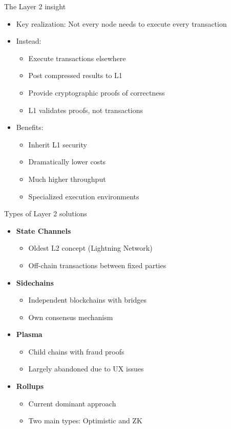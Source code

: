 \documentclass[aspectratio=169, lualatex, handout]{beamer}
\begin{document}
\begin{frame}{The Layer 2 insight}
	\begin{itemize}
		\item Key realization: Not every node needs to execute every transaction
		\item Instead:
		      \begin{itemize}
			      \item Execute transactions elsewhere
			      \item Post compressed results to L1
			      \item Provide cryptographic proofs of correctness
			      \item L1 validates proofs, not transactions
		      \end{itemize}
		\item Benefits:
		      \begin{itemize}
			      \item Inherit L1 security
			      \item Dramatically lower costs
			      \item Much higher throughput
			      \item Specialized execution environments
		      \end{itemize}
	\end{itemize}
\end{frame}

\begin{frame}{Types of Layer 2 solutions}
	\begin{itemize}
		\item \textbf{State Channels}
		      \begin{itemize}
			      \item Oldest L2 concept (Lightning Network)
			      \item Off-chain transactions between fixed parties
		      \end{itemize}
		\item \textbf{Sidechains}
		      \begin{itemize}
			      \item Independent blockchains with bridges
			      \item Own consensus mechanism
		      \end{itemize}
		\item \textbf{Plasma}
		      \begin{itemize}
			      \item Child chains with fraud proofs
			      \item Largely abandoned due to UX issues
		      \end{itemize}
		\item \textbf{Rollups}
		      \begin{itemize}
			      \item Current dominant approach
			      \item Two main types: Optimistic and ZK
		      \end{itemize}
	\end{itemize}
\end{frame}
\end{document}
